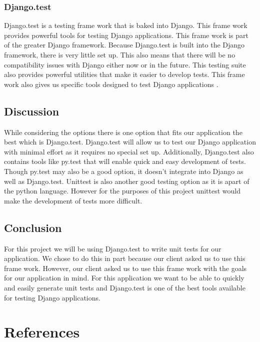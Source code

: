 \documentclass[onecolumn, draftclsnofoot,10pt, compsoc]{article}
\begin{document}
		\subsubsection{Django.test}
			Django.test is a testing frame work that is baked into Django. This frame work provides powerful tools for testing Django applications. This frame work is part of the greater Django framework. Because Django.test is built into the Django framework, there is very little set up. This also means that there will be no compatibility issues with Django either now or in the future. This testing suite also provides powerful utilities that make it easier to develop tests. This frame work also gives us specific tools designed to test Django applications \cite{IEEEexample:MDNDjango}.
	\subsection{Discussion}
		While considering the options there is one option that fits our application the best which is Django.test. Django.test will allow us to test our Django application with minimal effort as it requires no special set up. Additionally, Django.test also contains tools like py.test that will enable quick and easy development of tests. Though py.test may also be a good option, it doesn't integrate into Django as well as Django.test. Unittest is also another good testing option as it is apart of the python language. However for the purposes of this project unittest would make the development of tests more difficult. 
	\subsection{Conclusion}
		For this project we will be using Django.test to write unit tests for our application. We chose to do this in part because our client asked us to use this frame work. However, our client asked us to use this frame work with the goals for our application in mind. For this application we want to be able to quickly and easily generate unit tests and Django.test is one of the best tools available for testing Django applications.
\section{References}


\end{document}
